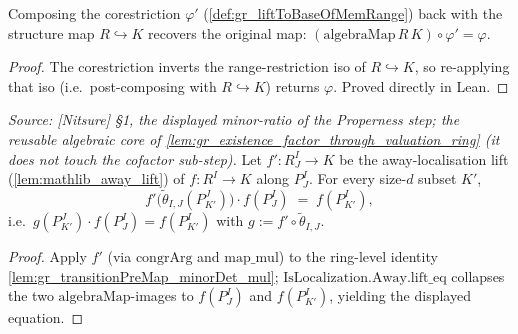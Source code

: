 \begin{lemma}

  \label{lem:gr_algebraMap_comp_liftToBaseOfMemRange}
  Composing the corestriction \(\varphi'\) (\cref{def:gr_liftToBaseOfMemRange}) back with the
  structure map \(R \hookrightarrow K\) recovers the original map:
  \((\mathrm{algebraMap}\,R\,K) \circ \varphi' = \varphi\).
\end{lemma}
\begin{proof}

\leanok
  The corestriction inverts the range-restriction iso of \(R \hookrightarrow K\), so re-applying that
  iso (i.e.\ post-composing with \(R \hookrightarrow K\)) returns \(\varphi\). Proved directly in Lean.
\end{proof}

\begin{lemma}

  \label{lem:gr_existence_lift_transitionPreMap_minorDet_mul}
  \textit{Source: [Nitsure] \S1, the displayed minor-ratio of the Properness step; the reusable
  algebraic core of \cref{lem:gr_existence_factor_through_valuation_ring} (it does not touch the
  cofactor sub-step).}
  Let \(f' : R^I_J \to K\) be the away-localisation lift (\cref{lem:mathlib_away_lift}) of
  \(f : R^I \to K\) along \(P^I_J\). For every size-\(d\) subset \(K'\),
  \[
    f'\bigl(\tilde\theta_{I,J}(P^J_{K'})\bigr)\cdot f(P^I_J) \;=\; f(P^I_{K'}),
  \]
  i.e.\ \(g(P^J_{K'})\cdot f(P^I_J) = f(P^I_{K'})\) with \(g := f' \circ \tilde\theta_{I,J}\).
\end{lemma}
\begin{proof}
  \leanok
  Apply \(f'\) (via \(\mathrm{congrArg}\) and \(\mathrm{map\_mul}\)) to the ring-level identity
  \cref{lem:gr_transitionPreMap_minorDet_mul}; \(\mathrm{IsLocalization.Away.lift\_eq}\) collapses the
  two \(\mathrm{algebraMap}\)-images to \(f(P^I_J)\) and \(f(P^I_{K'})\), yielding the displayed
  equation.
\end{proof}


